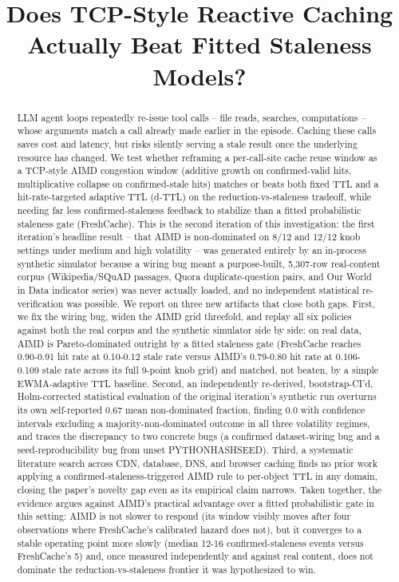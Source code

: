 \documentclass[11pt,letterpaper]{article}
\title{Does TCP-Style Reactive Caching Actually Beat Fitted Staleness Models?}
\author{}
\date{}
\begin{document}
\maketitle

\begin{abstract}
LLM agent loops repeatedly re-issue tool calls -- file reads, searches, computations -- whose
arguments match a call already made earlier in the episode. Caching these calls saves cost and latency,
but risks silently serving a stale result once the underlying resource has changed. We test whether
reframing a per-call-site cache reuse window as a TCP-style AIMD congestion window (additive growth on
confirmed-valid hits, multiplicative collapse on confirmed-stale hits) matches or beats both fixed TTL
and a hit-rate-targeted adaptive TTL (d-TTL) on the reduction-vs-staleness tradeoff, while needing far
less confirmed-staleness feedback to stabilize than a fitted probabilistic staleness gate (FreshCache).
This is the second iteration of this investigation: the first iteration's headline result -- that AIMD is
non-dominated on 8/12 and 12/12 knob settings under medium and high volatility -- was generated entirely
by an in-process synthetic simulator because a wiring bug meant a purpose-built, 5,307-row real-content
corpus (Wikipedia/SQuAD passages, Quora duplicate-question pairs, and Our World in Data indicator series)
was never actually loaded, and no independent statistical re-verification was possible. We report on three
new artifacts that close both gaps. First, we fix the wiring bug, widen the AIMD grid threefold, and
replay all six policies against both the real corpus and the synthetic simulator side by side: on real
data, AIMD is Pareto-dominated outright by a fitted staleness gate (FreshCache reaches 0.90-0.91 hit rate
at 0.10-0.12 stale rate versus AIMD's 0.79-0.80 hit rate at 0.106-0.109 stale rate across its full 9-point
knob grid) and matched, not beaten, by a simple EWMA-adaptive TTL baseline. Second, an independently
re-derived, bootstrap-CI'd, Holm-corrected statistical evaluation of the original iteration's synthetic
run overturns its own self-reported 0.67 mean non-dominated fraction, finding 0.0 with confidence
intervals excluding a majority-non-dominated outcome in all three volatility regimes, and traces the
discrepancy to two concrete bugs (a confirmed dataset-wiring bug and a seed-reproducibility bug from
unset PYTHONHASHSEED). Third, a systematic literature search across CDN, database, DNS, and browser
caching finds no prior work applying a confirmed-staleness-triggered AIMD rule to per-object TTL in any
domain, closing the paper's novelty gap even as its empirical claim narrows. Taken together, the evidence
argues against AIMD's practical advantage over a fitted probabilistic gate in this setting: AIMD is not
slower to respond (its window visibly moves after four observations where FreshCache's calibrated hazard
does not), but it converges to a stable operating point more slowly (median 12-16 confirmed-staleness
events versus FreshCache's 5) and, once measured independently and against real content, does not
dominate the reduction-vs-staleness frontier it was hypothesized to win.
\end{abstract}
\end{document}
